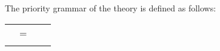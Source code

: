 \begin{isabellebody}
\begin{isamarkuptext}
\begin{center}
\begin{tabular}{rclc}
  \end{tabular}
  \end{center}%
\end{isamarkuptext}%
\isamarkuptrue%
%
\isamarkuptrue%
%
\begin{isamarkuptext}%
The priority grammar of the  theory is defined as follows:


  \begin{center}
  \begin{supertabular}{rclr}

  \hypertarget{syntax.inner.any}{\hyperlink{syntax.inner.any}{\mbox{}}} & = &  \\\\


\end{supertabular}
\end{center}
\end{isamarkuptext}
\end{isabellebody}
